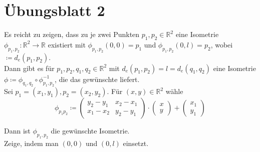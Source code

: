 % 
\section{Übungsblatt 2}

\begin{problem*}[1a]
  Es reicht zu zeigen, dass zu je zwei Punkten \( p_1, p_2 \in \mathbb{R}^2 \) eine Isometrie \( \phi_{p_1,p_2}: \mathbb{R}^2 \to \mathbb{R} \) existiert mit \( \phi_{p_1,p_2}(0,0) = p_1 \) und \( \phi_{p_1,p_2}(0,l) = p_2 \), wobei \( \coloneqq d_e(p_1,p_2) \). \\
  Dann gibt es für \( p_1,p_2,q_1,q_2 \in \mathbb{R}^2 \) mit \( d_e(p_1,p_2) = l = d_e(q_1,q_2) \) eine Isometrie \( \phi \coloneqq \phi_{q_1,q_2} \circ \phi_{p_1,p_2}^{-1} \), die das gewünschte liefert. \\ 
  Sei \( p_1 = (x_1,y_1), p_2 = (x_2, y_2) \). Für \( (x,y) \in \mathbb{R}^2 \) wähle
  \begin{equation*}
    \phi_{p_1p_2} \coloneqq \begin{pmatrix}
      y_2-y_1 & x_2 - x_1 \\
      x_1 - x_2 & y_2 -y_1
    \end{pmatrix} \cdot
    \begin{pmatrix}
      x \\ y	
    \end{pmatrix} + 
    \begin{pmatrix}
      x_1 \\ y_1
    \end{pmatrix}
  \end{equation*}
  
  Dann ist \( \phi_{p_1,p_2} \) die gewünschte Isometrie. \\
  Zeige, indem man \( (0,0) \) und \( (0,l) \) einsetzt.
\end{problem*}

